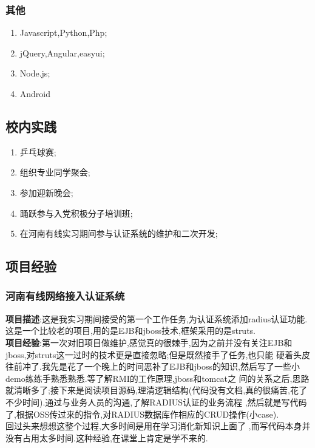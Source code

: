 \documentclass{ctexart}
\begin{document}
\subsubsection{其他}
\label{sec-1-2-4}
\begin{enumerate}
\item Javascript,Python,Php;
\item jQuery,Angular,easyui;
\item Node.js;
\item Android
\end{enumerate}
\subsection{校内实践}
\label{sec-1-3}
\begin{enumerate}
\item 乒乓球赛;
\item 组织专业同学聚会;
\item 参加迎新晚会;
\item 踊跃参与入党积极分子培训班;
\item 在河南有线实习期间参与认证系统的维护和二次开发;
\end{enumerate}
\subsection{项目经验}
\label{sec-1-4}
\subsubsection{河南有线网络接入认证系统}
\label{sec-1-4-1}
\noindent \textbf{项目描述}:这是我实习期间接受的第一个工作任务,为认证系统添加radius认证功能.这是一个比较老的项目,用的是EJB和jboss技术,框架采用的是struts.\\
\textbf{项目经验}:第一次对旧项目做维护,感觉真的很棘手,因为之前并没有关注EJB和jboss,对struts这一过时的技术更是直接忽略;但是既然接手了任务,也只能
硬着头皮往前冲了.我先是花了一个晚上的时间恶补了EJB和jboss的知识,然后写了一些小demo练练手熟悉熟悉.等了解RMI的工作原理,jboss和tomcat之
间的关系之后,思路就清晰多了;接下来是阅读项目源码,理清逻辑结构(代码没有文档,真的很痛苦,花了不少时间).通过与业务人员的沟通,了解RADIUS认证的业务流程
,然后就是写代码了,根据OSS传过来的指令,对RADIUS数据库作相应的CRUD操作(小case).\\回过头来想想这整个过程,大多时间是用在学习消化新知识上面了
,而写代码本身并没有占用太多时间.这种经验,在课堂上肯定是学不来的.
\end{document}
